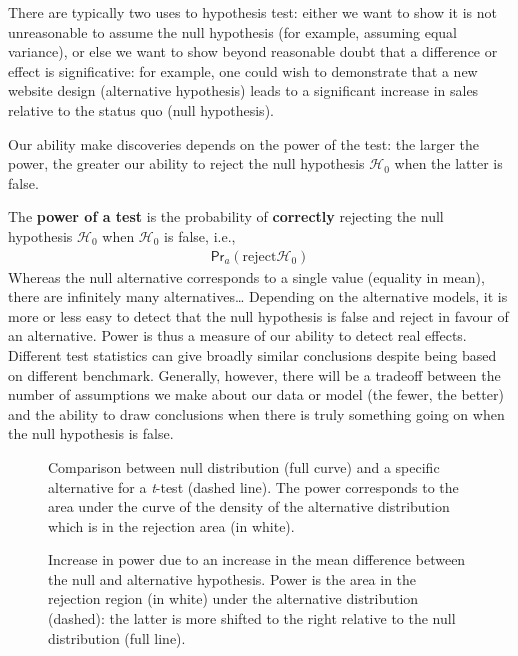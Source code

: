 \documentclass[
  11pt,
  letterpaper,
]{scrbook}
\theoremstyle{definition}
\theoremstyle{definition}
\theoremstyle{remark}
\begin{document}
There are typically two uses to hypothesis test: either we want to show
it is not unreasonable to assume the null hypothesis (for example,
assuming equal variance), or else we want to show beyond reasonable
doubt that a difference or effect is significative: for example, one
could wish to demonstrate that a new website design (alternative
hypothesis) leads to a significant increase in sales relative to the
status quo (null hypothesis).

Our ability make discoveries depends on the power of the test: the
larger the power, the greater our ability to reject the null hypothesis
\(\mathscr{H}_0\) when the latter is false.

The \textbf{power of a test} is the probability of \textbf{correctly}
rejecting the null hypothesis \(\mathscr{H}_0\) when \(\mathscr{H}_0\)
is false, i.e., \begin{align*}
\mathsf{Pr}_a(\text{reject} \mathscr{H}_0)
\end{align*} Whereas the null alternative corresponds to a single value
(equality in mean), there are infinitely many alternatives\ldots{}
Depending on the alternative models, it is more or less easy to detect
that the null hypothesis is false and reject in favour of an
alternative. Power is thus a measure of our ability to detect real
effects. Different test statistics can give broadly similar conclusions
despite being based on different benchmark. Generally, however, there
will be a tradeoff between the number of assumptions we make about our
data or model (the fewer, the better) and the ability to draw
conclusions when there is truly something going on when the null
hypothesis is false.

\begin{figure}[ht!]


\caption{\label{fig-power1}Comparison between null distribution (full
curve) and a specific alternative for a \emph{t}-test (dashed line). The
power corresponds to the area under the curve of the density of the
alternative distribution which is in the rejection area (in white).}

\end{figure}%

\begin{figure}[ht!]


\caption{\label{fig-power2}Increase in power due to an increase in the
mean difference between the null and alternative hypothesis. Power is
the area in the rejection region (in white) under the alternative
distribution (dashed): the latter is more shifted to the right relative
to the null distribution (full line).}

\end{figure}%
\end{document}
